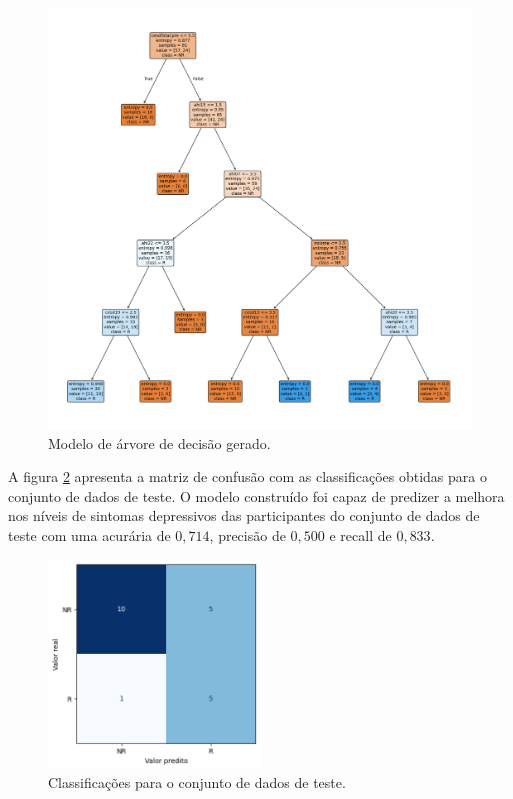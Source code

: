 \begin{figure}[h]
    \centering
    \includegraphics[width=\textwidth]{./03-exemplo/imagens/arvore.png}
    \caption{Modelo de árvore de decisão gerado.}
    \label{fig:arvore}
\end{figure}

A figura \ref{fig:matriz} apresenta a matriz de confusão com as classificações obtidas para o conjunto de dados de teste. O modelo construído foi capaz de predizer a melhora nos níveis de sintomas
depressivos das participantes do conjunto de dados de teste com uma acurária de $0,714$, precisão de $0,500$ e recall de $0,833$.

\begin{figure}[h]
    \centering
    \includegraphics[width=0.5\textwidth]{./03-exemplo/imagens/matriz.png}
    \caption{Classificações para o conjunto de dados de teste.}
    \label{fig:matriz}
\end{figure}

